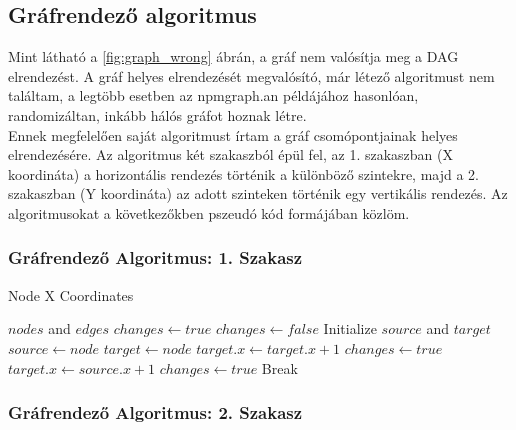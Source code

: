 \pagebreak

\subsection{Gráfrendező algoritmus}
Mint látható a \ref{fig:graph_wrong} ábrán, a gráf nem valósítja meg a DAG elrendezést. A gráf helyes elrendezését megvalósító, már létező algoritmust nem találtam, a legtöbb esetben az npmgraph.an példájához hasonlóan, randomizáltan, inkább hálós gráfot hoznak létre. \\

Ennek megfelelően saját algoritmust írtam a gráf csomópontjainak helyes elrendezésére. Az algoritmus két szakaszból épül fel, az 1. szakaszban (X koordináta) a horizontális rendezés történik a különböző szintekre, majd a 2. szakaszban (Y koordináta) az adott szinteken történik egy vertikális rendezés. Az algoritmusokat a következőkben pszeudó kód formájában közlöm.

\subsubsection{Gráfrendező Algoritmus: 1. Szakasz}

\begin{algorithm}
	\caption{Node X Coordinates}
	\centering
	\begin{algorithmic}
		\Require $nodes$ and $edges$		
		\State $changes \gets true$
			\State $changes \gets false$
				\State Initialize $source$ and $target$
						\State $source \gets node$
						\State $target \gets node$
					\EndIf
							\State $target.x \gets target.x+1$
							\State $changes \gets true$
							\State $target.x \gets source.x+1$
							\State $changes \gets true$
						\EndIf
						\State Break 
					\EndIf
				\EndFor
			\EndFor
		\EndWhile 
	\end{algorithmic}
\end{algorithm}

\pagebreak

\subsubsection{Gráfrendező Algoritmus: 2. Szakasz}

